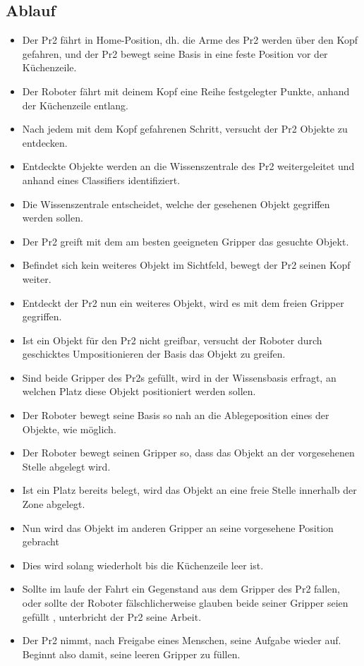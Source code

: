 \documentclass{suturo}
\begin{document}
\subsection{Ablauf}
\begin{itemize}
\item Der Pr2 fährt in Home-Position, dh. die Arme des Pr2 werden über den Kopf gefahren, und der Pr2 bewegt seine Basis in eine feste Position vor der Küchenzeile.
\item Der Roboter fährt mit deinem Kopf eine Reihe festgelegter Punkte, anhand der Küchenzeile entlang.
\item Nach jedem mit dem Kopf gefahrenen Schritt, versucht der Pr2 Objekte zu entdecken. 
\item Entdeckte Objekte werden an die Wissenszentrale des Pr2 weitergeleitet und anhand eines Classifiers identifiziert.
\item Die Wissenszentrale entscheidet, welche der gesehenen Objekt gegriffen werden sollen.
\item Der Pr2 greift mit dem am besten geeigneten Gripper das gesuchte Objekt. 
\item Befindet sich kein weiteres Objekt im Sichtfeld, bewegt der Pr2 seinen Kopf weiter. 
\item Entdeckt der Pr2 nun ein weiteres Objekt, wird es mit dem freien Gripper gegriffen.
\item Ist ein Objekt für den Pr2 nicht greifbar, versucht der Roboter durch geschicktes Umpositionieren der Basis das Objekt zu greifen.
\item Sind beide Gripper des Pr2s gefüllt, wird in der Wissensbasis erfragt, an welchen Platz diese Objekt positioniert werden sollen.
\item Der Roboter bewegt seine Basis so nah an die Ablegeposition eines der Objekte, wie möglich.
\item Der Roboter bewegt seinen Gripper so, dass das Objekt an der vorgesehenen Stelle abgelegt wird.
\item Ist ein Platz bereits belegt, wird das Objekt an eine freie Stelle innerhalb der Zone abgelegt.
\item Nun wird das Objekt im anderen Gripper an seine vorgesehene Position gebracht
\item Dies wird solang wiederholt bis die Küchenzeile leer ist.
\item Sollte im laufe der Fahrt ein Gegenstand aus dem Gripper des Pr2 fallen, oder sollte der Roboter fälschlicherweise glauben beide seiner Gripper seien gefüllt , unterbricht der Pr2 seine Arbeit.
\item Der Pr2 nimmt, nach Freigabe eines Menschen, seine Aufgabe wieder auf. Beginnt also damit, seine leeren Gripper zu füllen.
\end{itemize}
\end{document}
